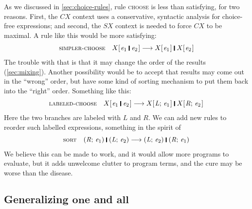 \documentclass[acmsmall,review,dvipsnames]{acmart}
\newcommand{\Conid}[1]{\mathit{#1}}
\newcommand{\Varid}[1]{\mathit{#1}}
\newcommand{\rulename}[1]{\textsc{\small #1}}
\newcommand{\movesto}{\longrightarrow}
\begin{document}
As we discussed in \cref{sec:choice-rules}, rule \rulename{choose} is less than satisfying, for two reasons.
First, the \ensuremath{CX} context uses a conservative, syntactic analysis for choice-free expressions; and second,
the \ensuremath{\Conid{SX}} context is needed to force \ensuremath{CX} to be maximal.  A rule like this would be more satisfying:
$$
\rulename{simpler-choose} \quad   \ensuremath{X [\mskip1.5mu \Varid{e}_{\mathrm{1}}\;\rule[-0.3mm]{0.5mm}{2.5mm}\;\Varid{e}_{\mathrm{2}}\mskip1.5mu]} \movesto \ensuremath{X [\mskip1.5mu \Varid{e}_{\mathrm{1}}\mskip1.5mu]\;\rule[-0.3mm]{0.5mm}{2.5mm}\;X [\mskip1.5mu \Varid{e}_{\mathrm{2}}\mskip1.5mu]}
$$
The trouble with that is that it may change the order of the results (\cref{sec:mixing}).
Another possibility would be to accept that results may come out in the ``wrong'' order, but have
some kind of sorting mechanism to put them back into the ``right'' order.  Something like this:
$$
\rulename{labeled-choose} \quad   \ensuremath{X [\mskip1.5mu \Varid{e}_{\mathrm{1}}\;\rule[-0.3mm]{0.5mm}{2.5mm}\;\Varid{e}_{\mathrm{2}}\mskip1.5mu]} \movesto \ensuremath{X [\mskip1.5mu \Conid{L};\,\Varid{e}_{\mathrm{1}}\mskip1.5mu]\;\rule[-0.3mm]{0.5mm}{2.5mm}\;X [\mskip1.5mu \Conid{R};\,\Varid{e}_{\mathrm{2}}\mskip1.5mu]}
$$
Here the two branches are labeled with \ensuremath{\Conid{L}} and \ensuremath{\Conid{R}}.  We can add new rules to reorder such
labelled expressions, something in the spirit of
$$
\rulename{sort} \quad   \ensuremath{(\Conid{R};\,\Varid{e}_{\mathrm{1}})\;\rule[-0.3mm]{0.5mm}{2.5mm}\;(\Conid{L};\,\Varid{e}_{\mathrm{2}})} \movesto \ensuremath{(\Conid{L};\,\Varid{e}_{\mathrm{2}})\;\rule[-0.3mm]{0.5mm}{2.5mm}\;(\Conid{R};\,\Varid{e}_{\mathrm{1}})}
$$
We believe this can be made to work, and it would allow more programs to evaluate, but it adds unwelcome clutter to program terms, and the cure
may be worse than the disease.

\subsection{Generalizing \ensuremath{\textbf{one}} and \ensuremath{\textbf{all}}}
\end{document}

